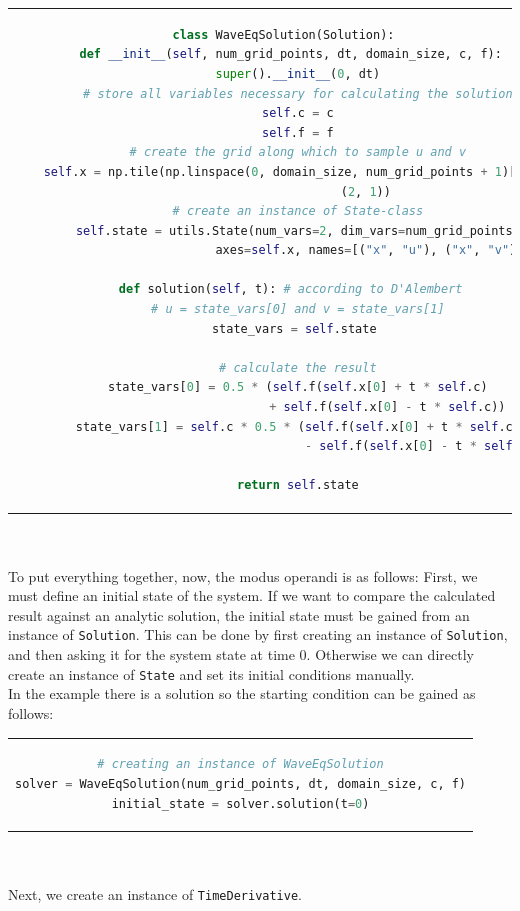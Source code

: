 \begin{tabular}{c}
\begin{lstlisting}[language=Python]
class WaveEqSolution(Solution):
  def __init__(self, num_grid_points, dt, domain_size, c, f):
    super().__init__(0, dt)
    # store all variables necessary for calculating the solution
    self.c = c
    self.f = f
    # create the grid along which to sample u and v
    self.x = np.tile(np.linspace(0, domain_size, num_grid_points + 1)[:-1],
                       (2, 1))
    # create an instance of State-class
    self.state = utils.State(num_vars=2, dim_vars=num_grid_points,
                         axes=self.x, names=[("x", "u"), ("x", "v")])

  def solution(self, t): # according to D'Alembert
    # u = state_vars[0] and v = state_vars[1]
    state_vars = self.state 
        
    # calculate the result
    state_vars[0] = 0.5 * (self.f(self.x[0] + t * self.c)
                             + self.f(self.x[0] - t * self.c))
    state_vars[1] = self.c * 0.5 * (self.f(self.x[0] + t * self.c)
                                       - self.f(self.x[0] - t * self.c))

    return self.state
\end{lstlisting}
\end{tabular}
\\\\
To put everything together, now, the modus operandi is as follows:
First, we must define an initial state of the system.
If we want to compare the calculated result against an analytic solution, the initial state must be gained from an instance of \texttt{Solution}.
This can be done by first creating an instance of \texttt{Solution}, and then asking it for the system state at time $0$.
Otherwise we can directly create an instance of \texttt{State} and set its initial conditions manually.
\\
In the example there is a solution so the starting condition can be gained as follows:\\
\begin{tabular}{c}
\begin{lstlisting}[language=Python]
# creating an instance of WaveEqSolution
solver = WaveEqSolution(num_grid_points, dt, domain_size, c, f)
initial_state = solver.solution(t=0)
\end{lstlisting}
\end{tabular}
\\\\
Next, we create an instance of \texttt{TimeDerivative}.\\
